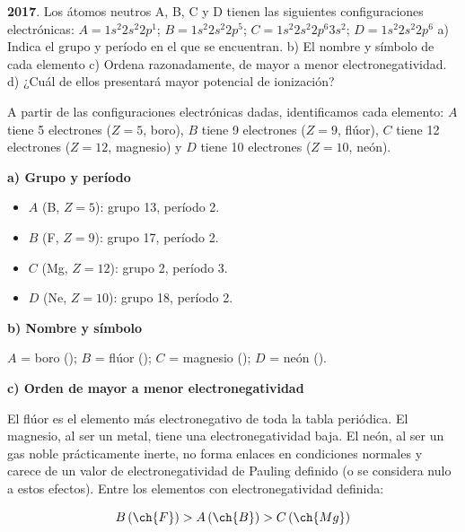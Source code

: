 \begin{exerciseEVAU}
    \textbf{2017}. Los átomos neutros A, B, C y D tienen las siguientes configuraciones electrónicas: $A = 1s^2 2s^2 2p^1$; $B = 1s^2 2s^2 2p^5$; $C = 1s^2 2s^2 2p^6 3s^2$; $D = 1s^2 2s^2 2p^6$
    a) Indica el grupo y período en el que se encuentran.
    b) El nombre y símbolo de cada elemento
    c) Ordena razonadamente, de mayor a menor electronegatividad.
    d) ¿Cuál de ellos presentará mayor potencial de ionización?

    \begin{solu}

        A partir de las configuraciones electrónicas dadas, identificamos cada elemento: \(A\) tiene 5 electrones (\(Z=5\), boro), \(B\) tiene 9 electrones (\(Z=9\), flúor), \(C\) tiene 12 electrones (\(Z=12\), magnesio) y \(D\) tiene 10 electrones (\(Z=10\), neón).

        \textbf{a) Grupo y período}

        \begin{itemize}
            \item \(A\) (B, \(Z=5\)): grupo 13, período 2.
            \item \(B\) (F, \(Z=9\)): grupo 17, período 2.
            \item \(C\) (Mg, \(Z=12\)): grupo 2, período 3.
            \item \(D\) (Ne, \(Z=10\)): grupo 18, período 2.
        \end{itemize}

        \textbf{b) Nombre y símbolo}

        \(A\) = boro (); \(B\) = flúor (); \(C\) = magnesio (); \(D\) = neón ().

        \textbf{c) Orden de mayor a menor electronegatividad}

        El flúor es el elemento más electronegativo de toda la tabla periódica. El magnesio, al ser un metal, tiene una electronegatividad baja. El neón, al ser un gas noble prácticamente inerte, no forma enlaces en condiciones normales y carece de un valor de electronegatividad de Pauling definido (o se considera nulo a estos efectos). Entre los elementos con electronegatividad definida:

        \begin{equation*}
            B\,(\ch{F}) > A\,(\ch{B}) > C\,(\ch{Mg})
        \end{equation*}


\end{solu}
\end{exerciseEVAU}
